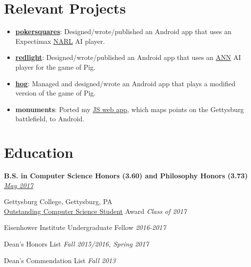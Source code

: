 \documentclass[11pt]{article}
\begin{document}
\section*{Relevant Projects} 
\begin{itemize}[noitemsep]
	\item \href{https://github.com/JohnDDuncanIII/PokerSquares}{\textbf{pokersquares}}: Designed/wrote/published an Android app that uses an Expectimax \href{https://www.aaai.org/ocs/index.php/AAAI/AAAI16/paper/view/12537/12191}{NARL} AI player. 
	\item \href{https://github.com/JohnDDuncanIII/redlight}{\textbf{redlight}}: Designed/wrote/published an Android app that uses an \href{http://cs.gettysburg.edu/~tneller/papers/fowlplay.pdf}{ANN} AI player for the game of Pig.
	\item \href{https://github.com/JohnDDuncanIII/hog}{\textbf{hog}}: Managed and designed/wrote an Android app that plays a modified version of the game of Pig. 
	\item \textbf{monuments}: Ported my \href{https://github.com/JohnDDuncanIII/dataswamp/tree/master/sites/monuments}{JS web app}, which maps points on the Gettysburg battlefield, to Android.
\end{itemize}

\section*{Education}
\textbf{\large{B.S. in Computer Science {\footnotesize Honors (3.60)} and Philosophy {\footnotesize Honors (3.73)}}}
\hfill
\href{https://www.gettysburg.edu/commencement/2017/pdfs/2017\%20Commencement\%20Program\%20FINAL.pdf}{\textit{May 2017}}

Gettysburg College, Gettysburg, PA \\

\href{http://www.gettysburg.edu/academics/cs/programs/honors.dot}{Outstanding Computer Science Student} Award \hfill \textit{Class of 2017}

Eisenhower Institute Undergraduate Fellow 
\hfill
\textit{2016-2017}

Dean's Honors List \hfill \textit{Fall 2015/2016, Spring 2017}

Dean's Commendation List \hfill \textit{Fall 2013}
\end{document}
